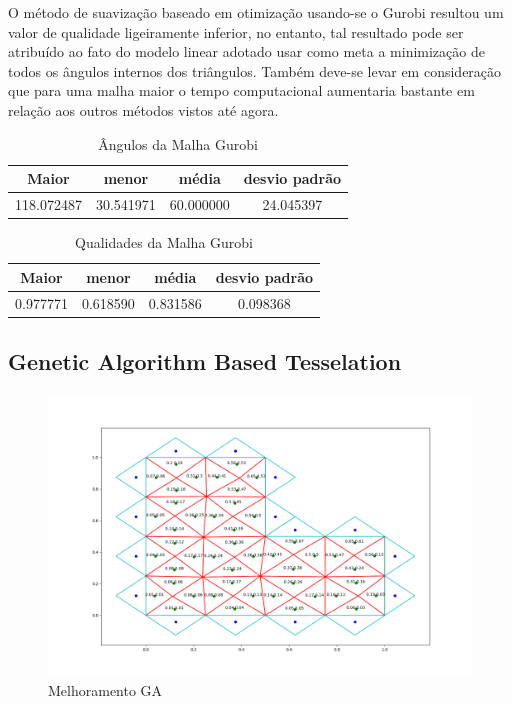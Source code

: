 O método de suavização baseado em otimização usando-se o Gurobi resultou um valor de qualidade ligeiramente inferior, no entanto, tal resultado pode ser atribuído ao fato do modelo linear adotado usar como meta a minimização de todos os ângulos internos dos triângulos. Também deve-se levar em consideração que para uma malha maior o tempo computacional aumentaria bastante em relação aos outros métodos vistos até agora.

\begin{table}[hb]
\centering
\par\caption{Ângulos da Malha Gurobi}
\begin{tabular}{c|c|c|c}
Maior&menor&média&desvio padrão\\\hline\hline
118.072487	&30.541971&60.000000&24.045397\\\hline
\end{tabular}
\label{tab:angulos-malha-gurobi}
\end{table}

\begin{table}[hb]
\centering
\par\caption{Qualidades da Malha Gurobi}
\begin{tabular}{c|c|c|c}
Maior&menor&média&desvio padrão\\\hline\hline
0.977771&0.618590&0.831586&0.098368\\\hline
\end{tabular}
\label{tab:qualidades-malha-gurobi}
\end{table}

\newpage
\subsection{Genetic Algorithm Based Tesselation}

\begin{figure}[ht]
    \centering
    \includegraphics[width=1\linewidth]{fig/malha-ga.png}
    \caption{Melhoramento GA}
    \label{fig:malha-ga}
\end{figure}

